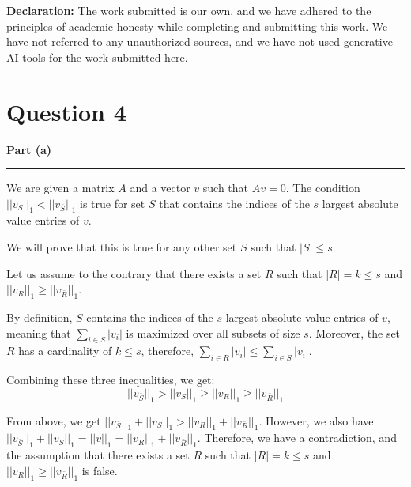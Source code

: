 \documentclass[a4paper,12pt]{article}
\title{\cooltitle{CS754 Assignment-2}}
\author{{\bf Saksham Rathi, Ekansh Ravi Shankar, Kshitij Vaidya}}
\date{}
\newenvironment{solution}[2][]{%
    \begin{mdframed}[linecolor=blue!70!black, linewidth=2pt, roundcorner=10pt, backgroundcolor=yellow!10!white, skipabove=12pt, skipbelow=12pt]%
        \textbf{\large #2}
        \par\noindent\rule{\textwidth}{0.4pt}
}{
    \end{mdframed}
}
\begin{document}
\maketitle
\textbf{Declaration:} The work submitted is our own, and we have adhered to the principles of academic honesty while completing and submitting this work. We have not referred to any unauthorized sources, and we have not used generative AI tools for the work submitted here.

\section*{Question 4}

\begin{solution}{Part (a)}
  We are given a matrix $A$ and a vector $v$ such that $Av = 0$. The condition $||v_S||_1 < ||v_{\bar{S}}||_1$ is true for set $S$ that contains the indices of the $s$ largest absolute value entries of $v$. 

  We will prove that this is true for any other set $S$ such that $|S| \leq s$. 

  Let us assume to the contrary that there exists a set $R$ such that $|R| = k \leq s$ and $||v_R||_1 \geq ||v_{\bar{R}}||_1$.

  By definition, $S$ contains the indices of the $s$ largest absolute value entries of $v$, meaning that $\sum_{i\in S}|v_i|$ is maximized over all subsets of size $s$. Moreover, the set $R$ has a cardinality of $k \leq s$, therefore, $\sum_{i\in R}|v_i| \leq \sum_{i\in S}|v_i|$. 

  Combining these three inequalities, we get:
\begin{equation}
  ||v_{\bar{S}}||_1 > ||v_S||_1 \geq ||v_R||_1 \geq ||v_{\bar{R}}||_1
\end{equation}

From above, we get $||v_{\bar{S}}||_1 + ||v_S||_1 > ||v_R||_1 + ||v_{\bar{R}}||_1$. However, we also have $||v_{\bar{S}}||_1 + ||v_S||_1 = ||v||_1 = ||v_R||_1 + ||v_{\bar{R}}||_1$. Therefore, we have a contradiction, and the assumption that there exists a set $R$ such that $|R| = k \leq s$ and $||v_R||_1 \geq ||v_{\bar{R}}||_1$ is false.

\end{solution}
\end{document}
